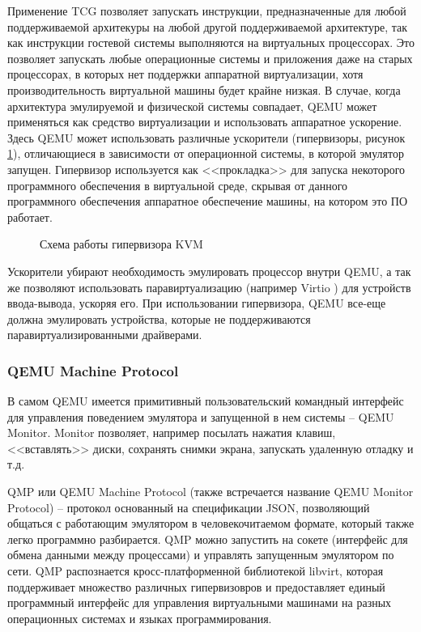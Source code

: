 Применение TCG позволяет запускать инструкции, предназначенные для любой поддерживаемой архитекуры
на любой другой поддерживаемой архитектуре, так как инструкции гостевой системы выполняются на виртуальных процессорах.
Это позволяет запускать любые операционные системы и приложения даже на старых процессорах, в которых нет поддержки
аппаратной виртуализации, хотя производительность виртуальной машины будет крайне низкая.
В случае, когда архитектура эмулируемой и физической системы совпадает, QEMU может применяться как средство виртуализации
и использовать аппаратное ускорение.
Здесь QEMU может использовать различные ускорители (гипервизоры, рисунок \ref{fig:kvm}),
отличающиеся в зависимости от операционной системы, в которой эмулятор запущен.
Гипервизор используется как <<прокладка>> для запуска некоторого программного обеспечения в виртуальной среде,
скрывая от данного программного обеспечения аппаратное обеспечение машины, на котором это ПО работает.

\begin{figure}[!htbp]
    \centering
    
    \caption{Схема работы гипервизора KVM}\label{fig:kvm}
\end{figure}

Ускорители убирают необходимость эмулировать процессор внутри QEMU, а так же позволяют использовать
паравиртуализацию (например Virtio \cite{virtio}) для устройств ввода-вывода, ускоряя его.
При использовании гипервизора, QEMU все-еще должна эмулировать устройства, которые не поддерживаются
паравиртуализированными драйверами.


\subsubsection{QEMU Machine Protocol}\label{sec:ch1/sec4/sub3/sub2}

В самом QEMU имеется примитивный пользовательский командный интерфейс для управления поведением эмулятора
и запущенной в нем системы -- QEMU Monitor. Monitor позволяет, например
посылать нажатия клавиш, <<вставлять>> диски, сохранять снимки экрана, запускать удаленную отладку и т.д.

QMP или QEMU Machine Protocol (также встречается название QEMU Monitor Protocol) -- протокол
основанный на спецификации JSON, позволяющий общаться с работающим эмулятором в человекочитаемом
формате, который также легко программно разбирается.
QMP можно запустить на сокете (интерфейс для обмена данными между процессами) и управлять запущенным эмулятором по сети.
QMP распознается кросс-платформенной библиотекой libvirt, которая поддерживает множество
различных гипервизовров и предоставляет единый программный интерфейс для управления виртуальными машинами на
разных операционных системах и языках программирования.

